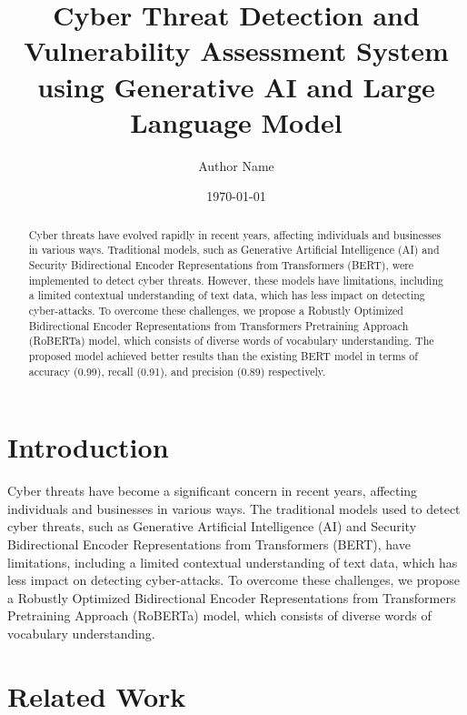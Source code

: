\documentclass{article}
\begin{document}
\title{Cyber Threat Detection and Vulnerability Assessment System using Generative AI and Large Language Model}

\author{Author Name}

\date{\today}

\maketitle

\begin{abstract}
Cyber threats have evolved rapidly in recent years, affecting individuals and businesses in various ways. Traditional models, such as Generative Artificial Intelligence (AI) and Security Bidirectional Encoder Representations from Transformers (BERT), were implemented to detect cyber threats. However, these models have limitations, including a limited contextual understanding of text data, which has less impact on detecting cyber-attacks. To overcome these challenges, we propose a Robustly Optimized Bidirectional Encoder Representations from Transformers Pretraining Approach (RoBERTa) model, which consists of diverse words of vocabulary understanding. The proposed model achieved better results than the existing BERT model in terms of accuracy (0.99), recall (0.91), and precision (0.89) respectively.
\end{abstract}

\section{Introduction}

Cyber threats have become a significant concern in recent years, affecting individuals and businesses in various ways. The traditional models used to detect cyber threats, such as Generative Artificial Intelligence (AI) and Security Bidirectional Encoder Representations from Transformers (BERT), have limitations, including a limited contextual understanding of text data, which has less impact on detecting cyber-attacks. To overcome these challenges, we propose a Robustly Optimized Bidirectional Encoder Representations from Transformers Pretraining Approach (RoBERTa) model, which consists of diverse words of vocabulary understanding.

\section{Related Work}
\end{document}
